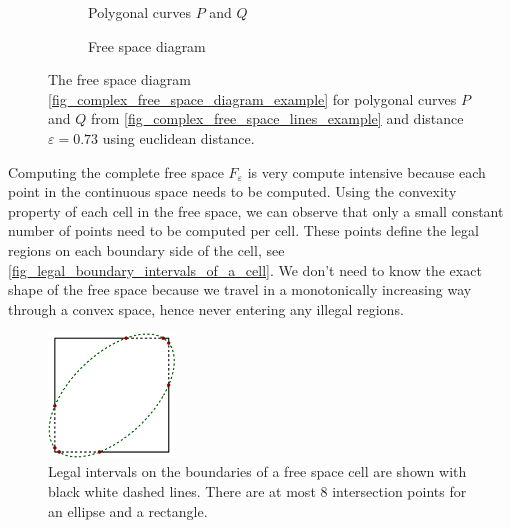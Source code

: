 \documentclass[
oneside,
fontsize=11pt
]{scrartcl}
\begin{document}
\begin{figure}[ht]
  \centering
  \begin{subfigure}[b]{0.45\textwidth}
      \resizebox{\textwidth}{!}{
        
      }
      \caption{Polygonal curves $P$ and $Q$}
      \label{fig_complex_free_space_lines_example}
  \end{subfigure}
  \hfill
  \begin{subfigure}[b]{0.45\textwidth}
      \resizebox{\textwidth}{!}{
        
      }
      \caption{Free space diagram}
      \label{fig_complex_free_space_diagram_example}
  \end{subfigure}
  \caption[Complex free space diagram example]{
    The free space diagram \autoref{fig_complex_free_space_diagram_example} 
    for polygonal curves $P$ and $Q$ from \autoref{fig_complex_free_space_lines_example} 
    and distance $\varepsilon = 0.73$ using euclidean distance.}
  \label{fig_complex_free_space}
\end{figure}

Computing the complete free space $F_\varepsilon$ is very compute intensive 
because each point in the continuous space needs to be computed. 
Using the convexity property of each cell in the free space,
we can observe that only a small constant number of points need to be computed per cell. 
These points define the legal regions on each boundary side of the cell, see \autoref{fig_legal_boundary_intervals_of_a_cell}. 
We don't need to know the exact shape of the free space 
because we travel in a monotonically increasing way through a convex space,
hence never entering any illegal regions.

\begin{figure}[ht]
  \centering
  \includegraphics[width=0.3\textwidth]{images/frechet_distance/square-ellipse-intersection.pdf}
  \caption[Legal intervals on free space cell boundary]{
    Legal intervals on the boundaries of a free space cell are shown with black white dashed lines. 
    There are at most 8 intersection points for an ellipse and a rectangle.}
  \label{fig_legal_boundary_intervals_of_a_cell}
\end{figure}
\end{document}

